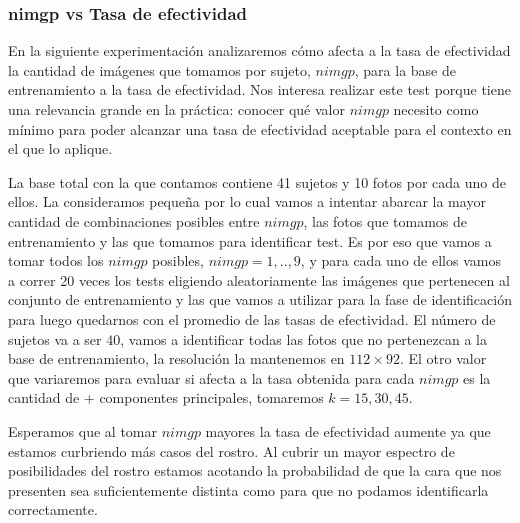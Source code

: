 \subsubsection{nimgp vs Tasa de efectividad}
En la siguiente experimentación analizaremos cómo afecta a la tasa de efectividad la cantidad de imágenes que tomamos por sujeto, $nimgp$, 
para la base de entrenamiento a la tasa de efectividad. Nos interesa realizar este test porque tiene una relevancia grande en la práctica:
conocer qué valor $nimgp$ necesito como mínimo para poder alcanzar una tasa de efectividad aceptable para el contexto en el que lo aplique.
\par
La base total con la que contamos contiene 41 sujetos y 10 fotos por cada uno de ellos. 
La consideramos pequeña por lo cual vamos a intentar abarcar la mayor cantidad de combinaciones posibles entre $nimgp$, las fotos que tomamos 
de entrenamiento y las que tomamos para identificar test. Es por eso que vamos a tomar todos los $nimgp$ posibles, $nimgp = 1,..,9$, y para cada
uno de ellos vamos a correr 20 veces los tests eligiendo aleatoriamente las imágenes que pertenecen al conjunto de entrenamiento y las
que vamos a utilizar para la fase de identificación para luego quedarnos con el promedio de las tasas de efectividad.
El número de sujetos va a ser $40$, vamos a identificar todas las fotos que no pertenezcan a la base de entrenamiento, la resolución la
mantenemos en $112 \times 92$. El otro valor que variaremos para evaluar si afecta a la tasa obtenida para cada $nimgp$ es la cantidad de +
componentes principales, tomaremos $k = 15, 30, 45$.
\par
Esperamos que al tomar $nimgp$ mayores la tasa de efectividad aumente ya que estamos curbriendo más casos del rostro. Al cubrir un mayor
espectro de posibilidades del rostro estamos acotando la probabilidad de que la cara que nos presenten sea suficientemente distinta
como para que no podamos identificarla correctamente.